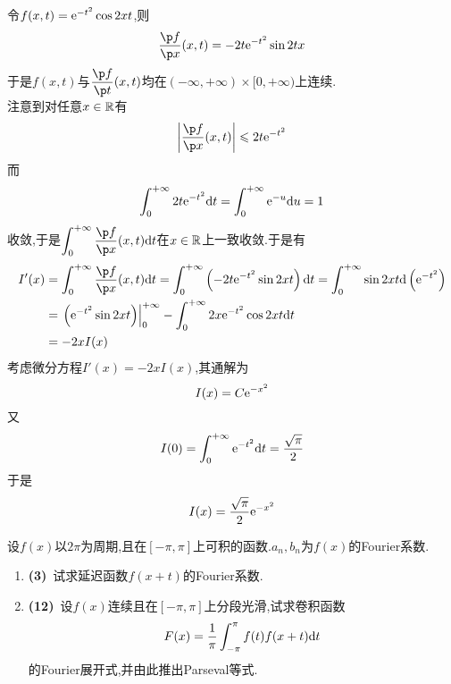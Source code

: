 \documentclass{ctexart}
\begin{document}
\begin{solution}
    令$f(x,t)=\mathrm{e}^{-t^2}\cos 2xt$,则
    \[\dfrac{\p f}{\p x}(x,t)=-2t\e^{-t^2}\sin 2tx\]
    于是$f(x,t)$与$\dfrac{\p f}{\p t}(x,t)$均在$(-\infty,+\infty)\times[0,+\infty)$上连续.\\
    注意到对任意$x\in\mathbb{R}$有
    \[\left|\dfrac{\p f}{\p x}(x,t)\right|\leqslant 2t\e^{-t^2}\]
    而
    \[\int_0^{+\infty}2t\mathrm{e}^{-t^2}\mathrm{d} t=\int_0^{+\infty}\mathrm{e}^{-u}\mathrm{d} u=1\]
    收敛,于是$\displaystyle\int_0^{+\infty}\dfrac{\p f}{\p x}(x,t)\di t$在$x\in\mathbb{R}$上一致收敛.于是有
    \[\begin{aligned}
        I'(x)
        &= \int_0^{+\infty}\dfrac{\p f}{\p x}(x,t)\di t
        = \int_0^{+\infty}\left(-2t\e^{-t^2}\sin 2xt\right)\di t
        = \int_0^{+\infty}\sin 2xt\di\left(\e^{-t^2}\right) \\
        &= \left.\left(\e^{-t^2}\sin 2xt\right)\right|_0^{+\infty}-\int_0^{+\infty}2x\e^{-t^2}\cos 2xt\di t \\
        &= -2xI(x)
    \end{aligned}\]
   考虑微分方程$I'(x)=-2xI(x)$,其通解为
   \[I(x)=C\mathrm{e}^{-x^2}\]
   又
   \[I(0)=\int_0^{+\infty}\mathrm{e}^{-t^2}\mathrm{d} t=\dfrac{\sqrt{\pi}}{2}\]
   于是
   \[I(x)=\dfrac{\sqrt\pi}{2}\mathrm{e}^{-x^2}\]

\end{solution}
\begin{problem}[8.(15\songti{分})]
    设$f(x)$以$2\pi$为周期,且在$[-\pi,\pi]$上可积的函数.$a_n,b_n$为$f(x)$的Fourier系数.
    \begin{enumerate}[label=\tbf{(\arabic*)},topsep=0pt,parsep=0pt,itemsep=0pt,partopsep=0pt]
        \item \textbf{(3)}\ 试求延迟函数$f(x+t)$的Fourier系数.
        \item \textbf{(12)}\ 设$f(x)$连续且在$[-\pi,\pi]$上分段光滑,试求卷积函数
            \[F(x)=\dfrac{1}{\pi}\int_{-\pi}^{\pi}f(t)f(x+t)\mathrm{d} t\]
            的Fourier展开式,并由此推出Parseval等式.

    \end{enumerate}
\end{problem}
\end{document}
